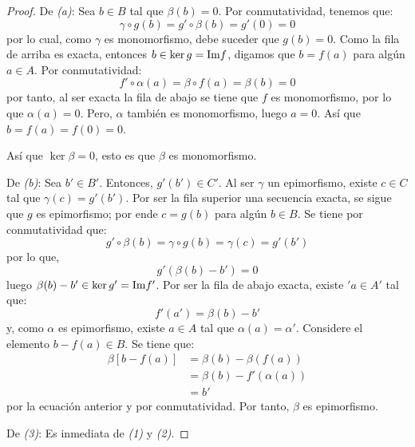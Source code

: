 \documentclass[12pt]{report}
\newcounter{it}
\theoremstyle{largebreak}
\newcommand{\im}{\ensuremath{\textup{Im}}}
\begin{document}
    \begin{proof}
        De \textit{(a)}: Sea $b\in B$ tal que $\beta(b)=0$. Por conmutatividad, tenemos que:
        \begin{equation*}
            \gamma\circ g(b)=g'\circ\beta(b)=g'(0)=0
        \end{equation*}
        por lo cual, como $\gamma$ es monomorfismo, debe suceder que $g(b)=0$. Como la fila de arriba es exacta, entonces $b\in\ker g=\im f$, digamos que $b=f(a)$ para algún $a\in A$. Por conmutatividad:
        \begin{equation*}
            f'\circ\alpha(a)=\beta\circ f(a)=\beta(b)=0
        \end{equation*}
        por tanto, al ser exacta la fila de abajo se tiene que $f$ es monomorfismo, por lo que $\alpha(a)=0$. Pero, $\alpha$ también es monomorfismo, luego $a=0$. Así que $b=f(a)=f(0)=0$.
        
        Así que $\ker\beta=0$, esto es que $\beta$ es monomorfismo.

        De \textit{(b)}: Sea $b'\in B'$. Entonces, $g'(b')\in C'$. Al ser $\gamma$ un epimorfismo, existe $c\in C$ tal que $\gamma(c)=g'(b')$. Por ser la fila superior una secuencia exacta, se sigue que $g$ es epimorfismo; por ende $c=g(b)$ para algún $b\in B$. Se tiene por conmutatividad que:
        \begin{equation*}
            g'\circ\beta(b)=\gamma\circ g(b)=\gamma(c)=g'(b')
        \end{equation*}
        por lo que,
        \begin{equation*}
            g'(\beta(b)-b')=0
        \end{equation*}
        luego $\beta(b)-b'\in\ker g'=\im f'$. Por ser la fila de abajo exacta, existe $'a\in A'$ tal que:
        \begin{equation*}
            f'(a')=\beta(b)-b'
        \end{equation*}
        y, como $\alpha$ es epimorfismo, existe $a\in A$ tal que $\alpha(a)=\alpha'$. Considere el elemento $b-f(a)\in B$. Se tiene que:
        \begin{equation*}
            \begin{split}
                \beta\left[b-f(a) \right]&=\beta(b)-\beta(f(a))\\
                &=\beta(b)-f'(\alpha(a))\\
                &=b'
            \end{split}
        \end{equation*}
        por la ecuación anterior y por conmutatividad. Por tanto, $\beta$ es epimorfismo.

        De \textit{(3)}: Es inmediata de \textit{(1)} y \textit{(2)}.
    \end{proof}
\end{document}
